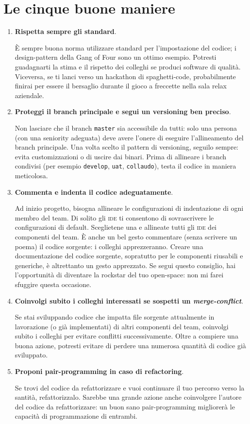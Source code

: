 \section{Le cinque buone maniere}

\begin{enumerate}

\item \textbf{Rispetta sempre gli standard}.

È sempre buona norma utilizzare standard per l’impostazione del codice; i design-pattern della Gang of Four sono un ottimo esempio. Potresti guadagnarti la stima e il rispetto dei colleghi se produci software di qualità. Viceversa, se ti lanci verso un hackathon di spaghetti-code, probabilmente finirai per essere il bersaglio durante il gioco a freccette nella sala relax aziendale.

\item \textbf{Proteggi il branch principale e segui un versioning ben preciso}.

Non lasciare che il branch \texttt{master} sia accessibile da tutti: solo una persona (con una seniority adeguata) deve avere l’onere di eseguire l’allineamento del branch principale. Una volta scelto il pattern di versioning, seguilo sempre: evita customizzazioni o di uscire dai binari. Prima di allineare i branch condivisi (per esempio \texttt{develop}, \texttt{uat}, \texttt{collaudo}), testa il codice in maniera meticolosa.


\item \textbf{Commenta e indenta il codice adeguatamente}.

Ad inizio progetto, bisogna allineare le configurazioni di indentazione di ogni membro del team. Di solito gli \textsc{ide} ti consentono di sovrascrivere le configurazioni di default. Sceglietene una e allineate tutti gli \textsc{ide} dei componenti del team. È anche un bel gesto commentare (senza scrivere un poema) il codice sorgente: i colleghi apprezzeranno. Creare una documentazione del codice sorgente, sopratutto per le componenti riusabili e generiche, è altrettanto un gesto apprezzato. Se segui questo consiglio, hai l’opportunità di diventare la rockstar del tuo open-space: non mi farei sfuggire questa occasione.


\item \textbf{Coinvolgi subito i colleghi interessati se sospetti un \emph{merge-conflict}}.

Se stai sviluppando codice che impatta file sorgente attualmente in lavorazione (o già implementati) di altri componenti del team, coinvolgi subito i colleghi per evitare conflitti successivamente. Oltre a compiere una buona azione, potresti evitare di perdere una numerosa quantità di codice già sviluppato.

\item \textbf{Proponi pair-programming in caso di refactoring}.

Se trovi del codice da refattorizzare e vuoi continuare il tuo percorso verso la santità, refattorizzalo. Sarebbe una grande azione anche coinvolgere l’autore del codice da refattorizzare: un buon sano pair-programming migliorerà le capacità di programmazione di entrambi.


\end{enumerate}